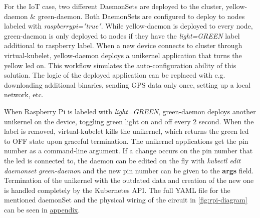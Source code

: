 For the IoT case, two different DaemonSets are deployed to the cluster, yellow-daemon \& green-daemon. Both DaemonSets are configured to deploy to nodes labeled with \textit{raspberrypi="true"}. While yellow-daemon is deployed to every node, green-daemon is only deployed to nodes if they have the \textit{light=GREEN} label additional to raspberry label. When a new device connects to cluster through virtual-kubelet, yellow-daemon deploys a unikernel application that turns the yellow led on. This workflow simulates the auto-configuration ability of this solution. The logic of the deployed application can be replaced with e.g. downloading additional binaries, sending GPS data only once, setting up a local network, etc.


When Raspberry Pi is labeled with \textit{light=GREEN}, green-daemon deploys another unikernel on the device, toggling green light on and off every 2 second. When the label is removed, virtual-kubelet kills the unikernel, which returns the green led to OFF state upon graceful termination. The unikernel applications get the pin number as a command-line argument. If a change occurs on the pin number that the led is connected to, the daemon can be edited on the fly with \textit{kubectl edit daemonset green-daemon} and the new pin number can be given to the \textbf{args} field. Termination of the unikernel with the outdated data and creation of the new one is handled completely by the Kubernetes API. The full YAML file for the mentioned daemonSet and the physical wiring of the circuit in \ref{fig:rpi-diagram} can be seen in \hyperref[chapter: Appendix]{appendix}.



